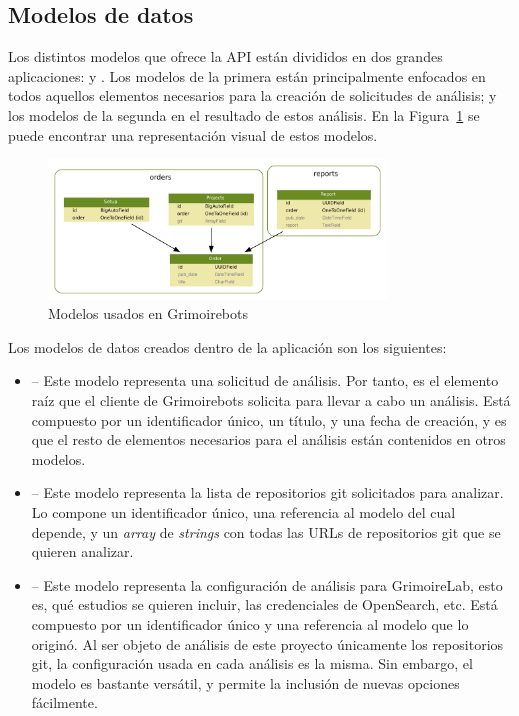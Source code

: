 \subsection{Modelos de datos} \label{sec:modelos-de-datos}

Los distintos modelos que ofrece la API están divididos en dos grandes aplicaciones:  y . Los modelos de la primera están principalmente enfocados en todos aquellos elementos necesarios para la creación de solicitudes de análisis; y los modelos de la segunda en el resultado de estos análisis. En la Figura~{\ref{fig:grimoirebots_models}} se puede encontrar una representación visual de estos modelos.

\begin{figure}[ht]
    \centering
    \includegraphics[width=0.8\textwidth]{Figures/grimoirebots_ii_models}
    \decoRule
    \caption[Grimoirebots (modelos)]{Modelos usados en Grimoirebots}
    \label{fig:grimoirebots_models}
\end{figure}

Los modelos de datos creados dentro de la aplicación  son los siguientes:

\begin{itemize}
    \item {} -- Este modelo representa una solicitud de análisis. Por tanto, es el elemento raíz que el cliente de Grimoirebots solicita para llevar a cabo un análisis. Está compuesto por un identificador único, un título, y una fecha de creación, y es que el resto de elementos necesarios para el análisis están contenidos en otros modelos.
    \item {} -- Este modelo representa la lista de repositorios git solicitados para analizar. Lo compone un identificador único, una referencia al modelo  del cual depende, y un \emph{array} de \emph{strings} con todas las URLs de repositorios git que se quieren analizar.
    \item {} -- Este modelo representa la configuración de análisis para GrimoireLab, esto es, qué estudios se quieren incluir, las credenciales de OpenSearch, etc. Está compuesto por un identificador único y una referencia al modelo  que lo originó. Al ser objeto de análisis de este proyecto únicamente los repositorios git, la configuración usada en cada análisis es la misma. Sin embargo, el modelo es bastante versátil, y permite la inclusión de nuevas opciones fácilmente.
\end{itemize}


